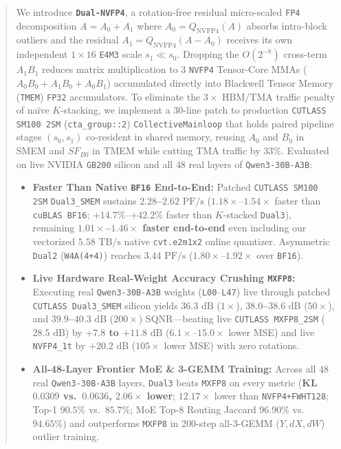 \documentclass[conference,10pt]{IEEEtran}
\begin{document}
\begin{abstract}
We introduce \textbf{\texttt{Dual-NVFP4}}, a rotation-free residual micro-scaled \texttt{FP4} decomposition $A = A_0 + A_1$ where $A_0 = Q_{\text{NVFP4}}(A)$ absorbs intra-block outliers and the residual $A_1 = Q_{\text{NVFP4}}(A - A_0)$ receives its own independent $1{\times}16$ \texttt{E4M3} scale $s_1 \ll s_0$. Dropping the $O(2^{-8})$ cross-term $A_1 B_1$ reduces matrix multiplication to $3$ \texttt{NVFP4} Tensor-Core MMAs ($A_0 B_0 + A_1 B_0 + A_0 B_1$) accumulated directly into Blackwell Tensor Memory (\texttt{TMEM}) \texttt{FP32} accumulators. To eliminate the $3\times$ HBM/TMA traffic penalty of na\"ive $K$-stacking, we implement a 30-line patch to production \texttt{CUTLASS SM100 2SM} (\texttt{cta\_group::2}) \texttt{CollectiveMainloop} that holds paired pipeline stages $(s_0, s_1)$ co-resident in shared memory, reusing $A_0$ and $B_0$ in SMEM and $SF_{B0}$ in TMEM while cutting TMA traffic by $33\%$. Evaluated on live NVIDIA \texttt{GB200} silicon and all $48$ real layers of \texttt{Qwen3-30B-A3B}:
\begin{itemize}
    \item \textbf{Faster Than Native \texttt{BF16} End-to-End:} Patched \texttt{CUTLASS SM100 2SM} \texttt{Dual3\_SMEM} sustains \textbf{$2.28$--$2.62\text{ PF/s}$} ($1.18\times$--$1.54\times$ faster than \texttt{cuBLAS BF16}; $+14.7\%$--$+42.2\%$ faster than $K$-stacked \texttt{Dual3}), remaining \textbf{$1.01\times$--$1.46\times$ faster end-to-end} even including our vectorized \textbf{$5.58\text{ TB/s}$} native \texttt{cvt.e2m1x2} online quantizer. Asymmetric \texttt{Dual2} (\texttt{W4A(4+4)}) reaches \textbf{$3.44\text{ PF/s}$} ($1.80\times$--$1.92\times$ over \texttt{BF16}).
    \item \textbf{Live Hardware Real-Weight Accuracy Crushing \texttt{MXFP8}:} Executing real \texttt{Qwen3-30B-A3B} weights (\texttt{L00}--\texttt{L47}) live through patched \texttt{CUTLASS Dual3\_SMEM} silicon yields \textbf{$36.3\text{ dB}$} ($1\times$), \textbf{$38.0$--$38.6\text{ dB}$} ($50\times$), and \textbf{$39.9$--$40.3\text{ dB}$} ($200\times$) SQNR---beating live \texttt{CUTLASS MXFP8\_2SM} ($28.5\text{ dB}$) by \textbf{$+7.8$ to $+11.8\text{ dB}$} ($6.1\times$--$15.0\times$ lower MSE) and live \texttt{NVFP4\_1t} by \textbf{$+20.2\text{ dB}$} ($105\times$ lower MSE) with zero rotations.
    \item \textbf{All-48-Layer Frontier MoE \& 3-GEMM Training:} Across all 48 real \texttt{Qwen3-30B-A3B} layers, \texttt{Dual3} beats \texttt{MXFP8} on every metric (\textbf{KL $0.0309$ vs.\ $0.0636$, $2.06\times$ lower}; $12.17\times$ lower than \texttt{NVFP4+FWHT128}; Top-1 $90.5\%$ vs.\ $85.7\%$; MoE Top-8 Routing Jaccard $96.90\%$ vs.\ $94.65\%$) and outperforms \texttt{MXFP8} in 200-step all-3-GEMM ($Y, dX, dW$) outlier training.
\end{itemize}
\end{abstract}
\end{document}

